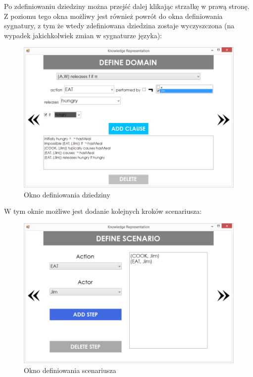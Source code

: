 \documentclass{article}
\begin{document}
Po zdefiniowaniu dziedziny można przejść dalej klikając strzałkę w prawą stronę. Z poziomu tego okna możliwy jest również powrót do okna definiowania sygnatury, z tym że wtedy zdefiniowana dziedzina zostaje wyczyszczona (na wypadek jakichkolwiek zmian w sygnaturze języka):

\begin{figure}[H]
\centering
\includegraphics[scale=0.4]{10}
\caption{Okno definiowania dziedziny}
\end{figure}
\newpage

W tym oknie możliwe jest dodanie kolejnych kroków scenariusza:

\begin{figure}[H]
\centering
\includegraphics[scale=0.4]{11}
\caption{Okno definiowania scenariusza}
\end{figure}
\end{document}
